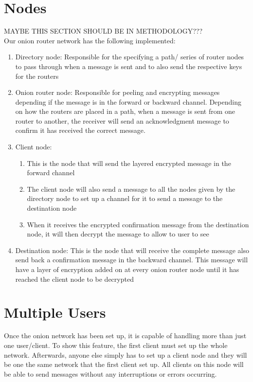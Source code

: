 \documentclass[10pt]{report}
\begin{document}
\section{Nodes}
MAYBE THIS SECTION SHOULD BE IN METHODOLOGY???\\
Our onion router network has the following implemented: 
\begin{enumerate}
    \item Directory node: Responsible for the specifying a path/ series of router nodes to pass through when a message is sent and to also send the respective keys for the routers
    \item Onion router node: Responsible for peeling and encrypting messages depending if the message is in the forward or backward channel. Depending on how the routers are placed in a path, when a message is sent from one router to another, the receiver will send an acknowledgment message to confirm it has received the correct message.
    \item Client node:
    \begin{enumerate}
        \item This is the node that will send the layered encrypted message in the forward channel
        \item The client node will also send a message to all the nodes given by the directory node to set up a channel for it to send a message to the destination node
        \item When it receives the encrypted confirmation message from the destination node, it will then decrypt the message to allow to user to see
    \end{enumerate}
    \item Destination node: This is the node that will receive the complete message also send back a confirmation message in the backward channel. This message will have a layer of encryption added on at every onion router node until it has reached the client node to be decrypted
\end{enumerate}
\section{Multiple Users}
    Once the onion network has been set up, it is capable of handling more than just one user/client. To show this feature, the first client must set up the whole network. Afterwards, anyone else simply has to set up a client node and they will be one the same network that the first client set up. All clients on this node will be able to send messages without any interruptions or errors occurring.
    
\end{document}
